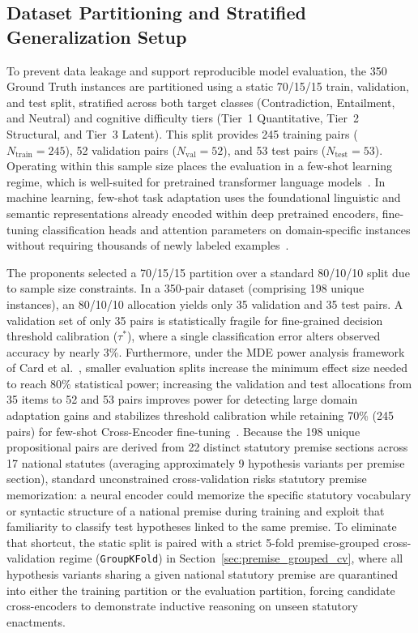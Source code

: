     \subsection{Dataset Partitioning and Stratified Generalization Setup}
    \label{sec:dataset_partitioning}
    To prevent data leakage and support reproducible model evaluation, the 350 Ground Truth instances are partitioned using a static 70/15/15 train, validation, and test split, stratified across both target classes (Contradiction, Entailment, and Neutral) and cognitive difficulty tiers (Tier~1 Quantitative, Tier~2 Structural, and Tier~3 Latent). This split provides 245 training pairs ($N_{\text{train}} = 245$), 52 validation pairs ($N_{\text{val}} = 52$), and 53 test pairs ($N_{\text{test}} = 53$). Operating within this sample size places the evaluation in a few-shot learning regime, which is well-suited for pretrained transformer language models~\cite{gao2021making}. In machine learning, few-shot task adaptation uses the foundational linguistic and semantic representations already encoded within deep pretrained encoders, fine-tuning classification heads and attention parameters on domain-specific instances without requiring thousands of newly labeled examples~\cite{gao2021making}.

    The proponents selected a 70/15/15 partition over a standard 80/10/10 split due to sample size constraints. In a 350-pair dataset (comprising 198 unique instances), an 80/10/10 allocation yields only 35 validation and 35 test pairs. A validation set of only 35 pairs is statistically fragile for fine-grained decision threshold calibration ($\tau^*$), where a single classification error alters observed accuracy by nearly 3\%. Furthermore, under the MDE power analysis framework of Card et al.~\cite{card2020with}, smaller evaluation splits increase the minimum effect size needed to reach 80\% statistical power; increasing the validation and test allocations from 35 items to 52 and 53 pairs improves power for detecting large domain adaptation gains and stabilizes threshold calibration while retaining 70\% (245 pairs) for few-shot Cross-Encoder fine-tuning~\cite{vabalas2019machine}. Because the 198 unique propositional pairs are derived from 22 distinct statutory premise sections across 17 national statutes (averaging approximately 9 hypothesis variants per premise section), standard unconstrained cross-validation risks statutory premise memorization: a neural encoder could memorize the specific statutory vocabulary or syntactic structure of a national premise during training and exploit that familiarity to classify test hypotheses linked to the same premise. To eliminate that shortcut, the static split is paired with a strict 5-fold premise-grouped cross-validation regime (\texttt{GroupKFold}) in Section~\ref{sec:premise_grouped_cv}, where all hypothesis variants sharing a given national statutory premise are quarantined into either the training partition or the evaluation partition, forcing candidate cross-encoders to demonstrate inductive reasoning on unseen statutory enactments.


